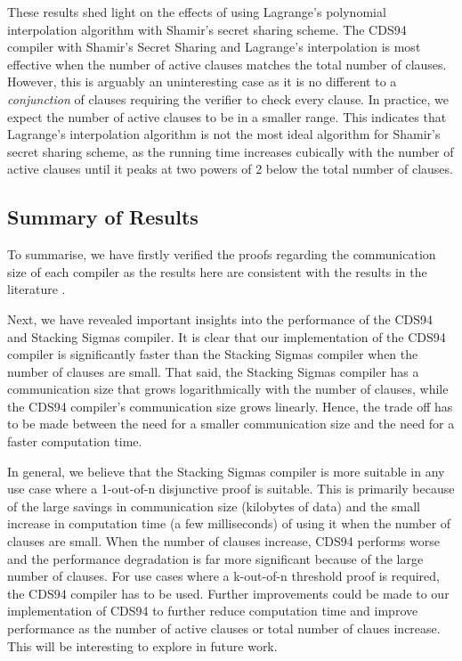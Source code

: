 These results shed light on the effects of using Lagrange's polynomial interpolation algorithm 
with Shamir's secret sharing scheme. The CDS94 compiler \cite{CDS94} with Shamir's Secret Sharing 
and Lagrange's interpolation is most effective when the number of active clauses matches the 
total number of clauses. However, this is arguably an uninteresting case as it is no different to 
a \textit{conjunction} of clauses requiring the verifier to check every clause. In practice, we 
expect the number of active clauses to be in a smaller range. This indicates that Lagrange's 
interpolation algorithm is not the most ideal algorithm for Shamir's secret sharing scheme, 
as the running time increases cubically with the number of active clauses until it peaks 
at two powers of 2 below the total number of clauses.

\subsection{Summary of Results}
To summarise, we have firstly verified the proofs regarding the communication size of each 
compiler as the results here are consistent with the results in the literature 
\cite{CDS94,StackingSigmas}. 

Next, we have revealed important insights into the performance 
of the CDS94 and Stacking Sigmas compiler. It is clear that our implementation of the 
CDS94 compiler is significantly faster than the Stacking Sigmas compiler when the number of 
clauses are small. That said, the Stacking Sigmas compiler has a communication size that 
grows logarithmically with the number of clauses, while the CDS94 compiler's communication
size grows linearly. Hence, the trade off has to be made between the need for a smaller 
communication size and the need for a faster computation time. 

In general, we believe that 
the Stacking Sigmas compiler is more suitable in any use case where a 1-out-of-n 
disjunctive proof is suitable. This is primarily because of the large savings 
in communication size (kilobytes of data) and the small increase in computation time 
(a few milliseconds) of using it when the number of clauses are small. When the number of 
clauses increase, CDS94 performs worse and the performance degradation is far more significant 
because of the large number of clauses. For use cases where a k-out-of-n threshold proof is 
required, the CDS94 compiler has to be used. Further improvements could be made to 
our implementation of CDS94 to further reduce computation time and improve performance 
as the number of active clauses or total number of claues increase. This will be interesting 
to explore in future work. 

